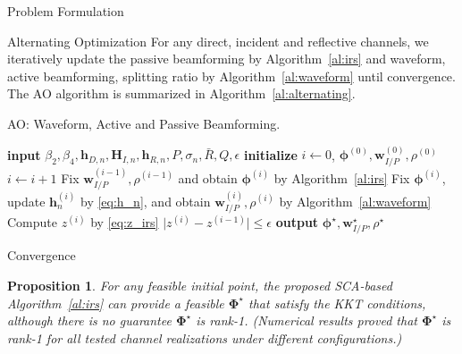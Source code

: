 \documentclass[journal]{IEEEtran}
\newtheorem{proposition}{Proposition}
\begin{document}
\begin{section}{Problem Formulation}
		\begin{subsection}{Alternating Optimization}
			For any direct, incident and reflective channels, we iteratively update the passive beamforming by Algorithm~\ref{al:irs} and waveform, active beamforming, splitting ratio by Algorithm~\ref{al:waveform} until convergence. The AO algorithm is summarized in Algorithm~\ref{al:alternating}.
			\begin{algorithm}[!t]
				\caption{AO: Waveform, Active and Passive Beamforming.}
				\label{al:alternating}
				\begin{algorithmic}[1]
					\State \textbf{input} $\beta_2,\beta_4,\boldsymbol{h}_{D,n},\boldsymbol{H}_{I,n},\boldsymbol{h}_{R,n},P,\sigma_n,\bar{R},Q,\epsilon$
					\State \textbf{initialize} $i \gets 0$, $\boldsymbol{\phi}^{(0)},\boldsymbol{w}_{I/P}^{(0)},\rho^{(0)}$
					\Repeat
						\State $i \gets i + 1$
						\State Fix $\boldsymbol{w}_{I/P}^{(i-1)},\rho^{(i-1)}$ and obtain $\boldsymbol{\phi}^{(i)}$ by Algorithm~\ref{al:irs}
						\State Fix $\boldsymbol{\phi}^{(i)}$, update $\boldsymbol{h}_n^{(i)}$ by \ref{eq:h_n}, and obtain $\boldsymbol{w}_{I/P}^{(i)}, \rho^{(i)}$ by Algorithm~\ref{al:waveform}
						\State Compute $z^{(i)}$ by \ref{eq:z_irs}
					\Until $\lvert z^{(i)} - z^{(i-1)} \rvert \le \epsilon$
					\State \textbf{output} $\boldsymbol{\phi}^{\star}, \boldsymbol{w}_{I/P}^{\star}, \rho^{\star}$
				\end{algorithmic}
			\end{algorithm}
		\end{subsection}


		\begin{subsection}{Convergence}
			\begin{proposition}\label{pr:irs}
				For any feasible initial point, the proposed SCA-based Algorithm~\ref{al:irs} can provide a feasible $\boldsymbol{\Phi}^{\star}$ that satisfy the KKT conditions, although there is no guarantee $\boldsymbol{\Phi}^{\star}$ is rank-\num{1}. (Numerical results proved that $\boldsymbol{\Phi}^{\star}$ is rank-\num{1} for all tested channel realizations under different configurations.)
			\end{proposition}


\end{subsection}
\end{section}
\end{document}
